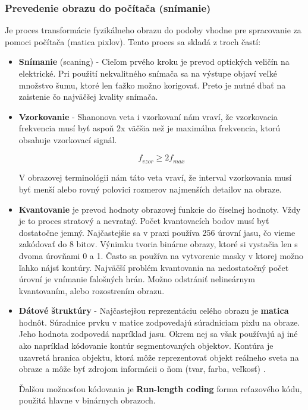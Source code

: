 \subsubsection{Prevedenie obrazu do počítača (snímanie)}
Je proces transformácie fyzikálneho obrazu do podoby vhodne pre spracovanie za pomoci počítača (matica pixlov). Tento proces sa skladá z troch častí\cite{Analysis_and_Machine_Vision}: 
\begin{itemize}
\item \textbf{Snímanie} (scaning) - Cieľom prvého kroku je prevod optických veličín na elektrické. Pri použití nekvalitného snímača sa na výstupe objaví veľké množstvo šumu, ktoré len ťažko možno korigovať. Preto je nutné dbať na zaistenie čo najväčšej kvality snímača. 

\item \textbf{Vzorkovanie} - Shanonova veta i vzorkovaní nám vraví, že vzorkovacia frekvencia musí byť aspoň 2x väčšia než je maximálna frekvencia, ktorú obsahuje vzorkovací signál.

$$\textit{f}_{\textit{vzor}} \ge {2} \textit{f}_{\textit{max}}$$

V obrazovej terminológii nám táto veta vraví, že interval vzorkovania musí byť menší alebo rovný polovici rozmerov najmenších detailov na obraze. 

\item \textbf{Kvantovanie} je prevod hodnoty obrazovej funkcie do číselnej hodnoty. Vždy je to proces stratový a nevratný. Počet kvantovacích bodov musí byť dostatočne jemný. Najčastejšie sa v praxi používa 256 úrovní jasu, čo vieme zakódovať do 8 bitov. Výnimku tvoria binárne obrazy, ktoré si vystačia len s dvoma úrovňami 0 a 1. Často sa používa na vytvorenie masky v ktorej možno ľahko nájsť kontúry. Najväčší problém kvantovania na nedostatočný počet úrovní je vnímanie falošných hrán. Možno odstrániť nelineárnym kvantovaním, alebo rozostrením obrazu. 


\item \textbf{Dátové štruktúry} - Najčastejšou reprezentáciu celého obrazu je \textbf{matica} hodnôt. Súradnice prvku v matice zodpovedajú súradniciam pixlu na obraze. Jeho hodnota zodpovedá napríklad jasu.  Okrem nej sa však používajú aj iné ako napríklad kódovanie kontúr segmentovaných objektov. Kontúra je uzavretá hranica objektu, ktorá môže reprezentovať objekt reálneho sveta na obraze a môže byť zdrojom informácii o ňom (tvar, farba, veľkosť) .

Ďalšou možnosťou kódovania je \textbf{Run-length coding} forma reťazového kódu, použitá hlavne v binárnych obrazoch. 


\end{itemize}
